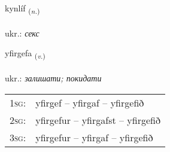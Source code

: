 \documentclass[frontgrid, backgrid]{flacards}\usepackage[]{graphicx}\usepackage[]{xcolor}
\begin{document}
\renewcommand{\flhead}{\vskip5pt \fboxsep=0pt {\small\bfseries\footnotesize Nafnorð | іменник}}
\renewcommand{\fcfoot}{\vskip5pt \fboxsep=0pt \hspace{2pt}{\small\bfseries\footnotesize 2K}}

\renewcommand{\blhead}{\vskip5pt {\small\bfseries\footnotesize Nafnorð | іменник }}
\renewcommand{\bcfoot}{\vskip5pt \hspace{2pt}{\small\bfseries\footnotesize 2K}}


{kynlíf \small{\textsubscript{(\textit{n.})}} \\[1ex] %
\textphonetic{[cʰɪnliv]} \\
ukr.: \emph{секс} \\  [2ex]
\renewcommand*{\arraystretch}{0.8}
}

\renewcommand{\flhead}{\vskip5pt \fboxsep=0pt {\small\bfseries\footnotesize Sagnorð | дієслово}}
\renewcommand{\fcfoot}{\vskip5pt \fboxsep=0pt \hspace{2pt}{\small\bfseries\footnotesize 2K}}

\renewcommand{\blhead}{\vskip5pt {\small\bfseries\footnotesize Sagnorð | дієслово }}
\renewcommand{\bcfoot}{\vskip5pt \hspace{2pt}{\small\bfseries\footnotesize 2K}}


{yfirgefa \small{\textsubscript{(\textit{v.})}} \\[1ex] %
\textphonetic{[ɪːvɪrcɛva]} \\
ukr.: \emph{залишати; покидати} \\  [2ex]
\renewcommand*{\arraystretch}{0.8}
\begin{tabular}{p{1cm}l}
\textsc{1sg}: & yfirgef -- yfirgaf -- yfirgefið \\ 
\textsc{2sg}: & yfirgefur -- yfirgafst -- yfirgefið \\ 
\textsc{3sg}: & yfirgefur -- yfirgaf -- yfirgefið \\ 
\end{tabular}
}
\end{document}
